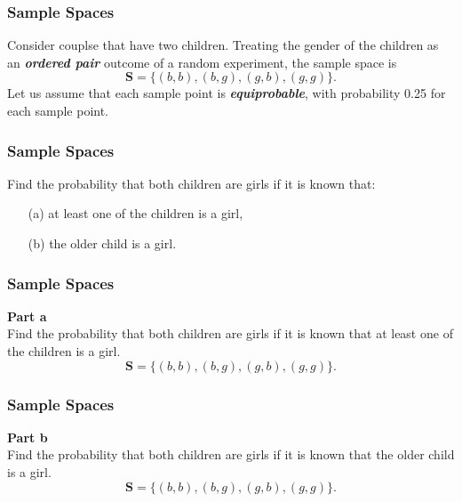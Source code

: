 \documentclass[IntroMain.tex]{subfiles}
\begin{document}
\begin{frame}
\frametitle{Sample Spaces}
\Large
Consider couplse that have two children. Treating the gender of the children as an \textit{\textbf{ordered pair}} outcome of a random experiment, the sample space is 
\[\boldsymbol{S} = \{ (b,b), (b,g), (g,b), (g,g)\}.\]
Let us assume that each sample point is \textit{\textbf{equiprobable}}, with probability 0.25 for each sample point.


\end{frame}

\begin{frame}
\frametitle{Sample Spaces}
\Large
\vspace{-1cm}
 Find the probability that both children are girls if it is known that: 

\begin{itemize}
\item[(a)] at least one of the children is a girl,
\item[(b)] the older child is a girl. 	
\end{itemize}	
\end{frame}


\begin{frame}
\frametitle{Sample Spaces}
\Large
\vspace{-1.5cm}
\textbf{Part a} \\
 Find the probability that both children are girls if it is known that at least one of the children is a girl.
\[\boldsymbol{S} = \{ (b,b), (b,g), (g,b), (g,g)\}.\]
	
\end{frame}

\begin{frame}
\frametitle{Sample Spaces}
\Large
\vspace{-1.5cm}
\textbf{Part b} \\
 Find the probability that both children are girls if it is known that the older child is a girl.
\[\boldsymbol{S} = \{ (b,b), (b,g), (g,b), (g,g)\}.\]
	
\end{frame}
\end{document}
